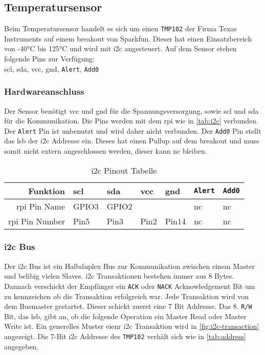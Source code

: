 \subsection{Temperatursensor}

Beim Temperatursensor handelt es sich um einen \texttt{TMP102} der Firma Texas Instruments auf einem \gls{breakout} von Sparkfun.
Dieser hat einen Einsatzbereich von -40\si{\celsius} bis 125\si{\celsius} und wird mit \gls{i2c} angesteuert.
Auf dem Sensor stehen folgende Pins zur Verfügung: \\
\gls{scl}, \gls{sda}, \gls{vcc}, \gls{gnd}, \texttt{Alert}, \texttt{Add0}

\subsubsection{Hardwareanschluss}

Der Sensor benötigt \gls{vcc} und \gls{gnd} für die Spannungsversorgung, sowie \gls{scl} und \gls{sda} für die Kommunikation.
Die Pins werden mit dem \gls{rpi} wie in \autoref{tab:i2c} verbunden.
Der \texttt{Alert} Pin ist unbenutzt und wird daher nicht verbunden.
Der \texttt{Add0} Pin stellt das \gls{lsb} der \gls{i2c} Addresse ein.
Dieses hat einen Pullup auf dem \gls{breakout} und muss somit nicht extern angeschlossen werden, dieser kann \gls{nc} bleiben.

\begin{table}[h]
    \centering
    \begin{tabular}{|r||l|l|l|l|l|l|}
        \hline
        \textbf{Funktion} & \textbf{\gls{scl}} & \textbf{\gls{sda}} & \textbf{\gls{vcc}} & \textbf{\gls{gnd}} & \textbf{\texttt{Alert}} & \textbf{\texttt{Add0}}\\
        \hline
        \hline
        \gls{rpi} Pin Name & GPIO3 & GPIO2 & & & \gls{nc} & \gls{nc} \\
        \hline
        \gls{rpi} Pin Number & Pin5 & Pin3 & Pin2 & Pin14 & \gls{nc} & \gls{nc} \\
        \hline
    \end{tabular}
    \caption{\gls{i2c} Pinout Tabelle}
    \label{tab:i2c}
\end{table}

\subsubsection{\acrshort{i2c} Bus}

Der \gls{i2c} Bus ist ein Halbduplex Bus zur Kommunikation zwischen einem Master und belibig vielen Slaves.
\gls{i2c} Transaktionen bestehen immer aus 8 Bytes.
Dannach verschickt der Empfänger ein \texttt{ACK} oder \texttt{NACK} Acknowledgement Bit um zu kennzeichen ob die Transaktion erfolgreich war.
Jede Transaktion wird von dem Busmaster gestartet.
Dieser schickt zuerst eine 7 Bit Addresse. Das 8. \texttt{R/W} Bit, das \gls{lsb}, gibt an, ob die folgende Operation ein Master Read oder Master Write ist.
Ein generelles Muster eienr \gls{i2c} Transaktion wird in \autoref{fig:i2c-transaction} angezeigt.
Die $7$-Bit \gls{i2c} Addresse des \texttt{TMP102} verhält sich wie in \autoref{tab:address} angegeben.

